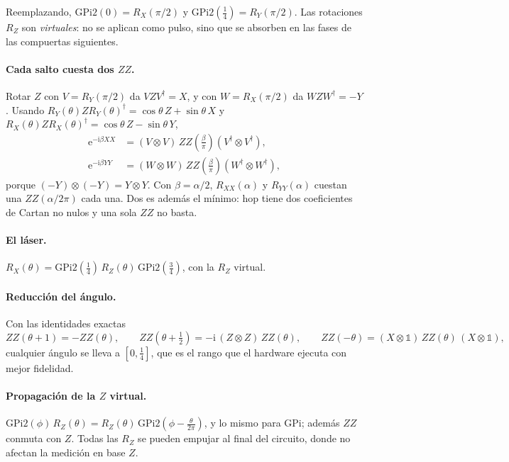 \documentclass[11pt,a4paper]{article}
\newcommand{\e}{\mathrm{e}}
\newcommand{\ii}{\mathrm{i}}
\newcommand{\hop}{\mathrm{hop}}
\newcommand{\RX}{R_X}
\newcommand{\RXX}{R_{XX}}
\newcommand{\RYY}{R_{YY}}
\theoremstyle{plain}
\theoremstyle{definition}
\theoremstyle{remark}
\begin{document}
Reemplazando, $\mathrm{GPi2}(0)=\RX(\pi/2)$ y $\mathrm{GPi2}(\tfrac14)=R_Y(\pi/2)$. Las rotaciones $R_Z$ son \emph{virtuales}: no se aplican como pulso, sino que se absorben en las fases de las compuertas siguientes.

\paragraph{Cada salto cuesta dos $ZZ$.} Rotar $Z$ con $V=R_Y(\pi/2)$ da $VZV^\dagger=X$, y con $W=\RX(\pi/2)$ da $WZW^\dagger=-Y$. Usando $R_Y(\theta)ZR_Y(\theta)^\dagger=\cos\theta\,Z+\sin\theta\,X$ y $\RX(\theta)Z\RX(\theta)^\dagger=\cos\theta\,Z-\sin\theta\,Y$,
\begin{align}
\e^{-\ii\beta XX}&=(V\otimes V)\,ZZ\!\left(\tfrac\beta\pi\right)(V^\dagger\otimes V^\dagger),\\
\e^{-\ii\beta YY}&=(W\otimes W)\,ZZ\!\left(\tfrac\beta\pi\right)(W^\dagger\otimes W^\dagger),
\end{align}
porque $(-Y)\otimes(-Y)=Y\otimes Y$. Con $\beta=\alpha/2$, $\RXX(\alpha)$ y $\RYY(\alpha)$ cuestan una $ZZ(\alpha/2\pi)$ cada una. Dos es además el mínimo: $\hop$ tiene dos coeficientes de Cartan no nulos y una sola $ZZ$ no basta.

\paragraph{El láser.} $\RX(\theta)=\mathrm{GPi2}(\tfrac14)\,R_Z(\theta)\,\mathrm{GPi2}(\tfrac34)$, con la $R_Z$ virtual.

\paragraph{Reducción del ángulo.} Con las identidades exactas
\begin{equation}
ZZ(\theta+1)=-ZZ(\theta),\qquad
ZZ(\theta+\tfrac12)=-\ii\,(Z\otimes Z)\,ZZ(\theta),\qquad
ZZ(-\theta)=(X\otimes\mathbb 1)\,ZZ(\theta)\,(X\otimes\mathbb 1),
\end{equation}
cualquier ángulo se lleva a $[0,\tfrac14]$, que es el rango que el hardware ejecuta con mejor fidelidad.

\paragraph{Propagación de la $Z$ virtual.} $\mathrm{GPi2}(\phi)\,R_Z(\theta)=R_Z(\theta)\,\mathrm{GPi2}(\phi-\tfrac{\theta}{2\pi})$, y lo mismo para GPi; además $ZZ$ conmuta con $Z$. Todas las $R_Z$ se pueden empujar al final del circuito, donde no afectan la medición en base $Z$.
\end{document}

